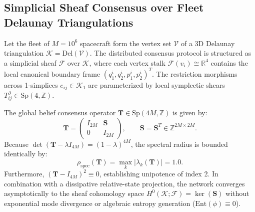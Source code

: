\documentclass[11pt,onecolumn]{article}
\begin{document}
\FloatBarrier
\subsection{Simplicial Sheaf Consensus over Fleet Delaunay Triangulations}
\label{subsec:simplicial_sheaf_consensus}
Let the fleet of $M = 10^6$ spacecraft form the vertex set $\mathcal{V}$ of a 3D Delaunay triangulation $\mathcal{K} = \mathrm{Del}(\mathcal{V})$. The distributed consensus protocol is structured as a simplicial sheaf $\mathcal{F}$ over $\mathcal{K}$, where each vertex stalk $\mathcal{F}(v_i) \cong \mathbb{R}^4$ contains the local canonical boundary frame $(q_1^i, q_2^i, p_1^i, p_2^i)^T$. The restriction morphisms across 1-simplices $e_{ij} \in \mathcal{K}_1$ are parameterized by local symplectic shears $T_{ij}^\partial \in \mathrm{Sp}(4, \mathbb{Z})$.

The global belief consensus operator $\mathbf{T} \in \mathrm{Sp}(4M, \mathbb{Z})$ is given by:
\begin{equation}
    \mathbf{T} = \begin{pmatrix} I_{2M} & \mathbf{S} \\ 0 & I_{2M} \end{pmatrix}, \qquad \mathbf{S} = \mathbf{S}^T \in \mathbb{Z}^{2M \times 2M}.
    \label{eq:global_symplectic_shear}
\end{equation}
Because $\det(\mathbf{T} - \lambda I_{4M}) = (1 - \lambda)^{4M}$, the spectral radius is bounded identically by:
\begin{equation}
    \rho_{\text{spec}}(\mathbf{T}) = \max_{k} |\lambda_k(\mathbf{T})| = 1.0.
    \label{eq:spectral_radius_unity}
\end{equation}
Furthermore, $(\mathbf{T} - I_{4M})^2 \equiv 0$, establishing unipotence of index 2. In combination with a dissipative relative-state projection, the network converges asymptotically to the sheaf cohomology space $H^0(\mathcal{K}; \mathcal{F}) = \ker(\mathbf{S})$ without exponential mode divergence or algebraic entropy generation ($\mathrm{Ent}(\phi) \equiv 0$).

\FloatBarrier
\end{document}
